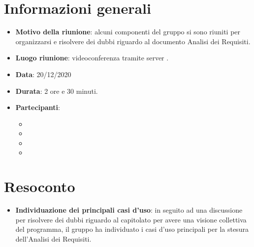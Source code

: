 \section{Informazioni generali}
\begin{itemize}
\item \textbf{Motivo della riunione}: alcuni componenti del gruppo si sono riuniti per organizzarsi e risolvere dei dubbi riguardo al documento Analisi dei Requisiti.
\item \textbf{Luogo riunione}: videoconferenza tramite server .
\item \textbf{Data}: 20/12/2020
\item \textbf{Durata}: 2 ore e 30 minuti.
\item \textbf{Partecipanti}:
	\begin{itemize}
	\item \BM{}
	\item \SG{}
	\item \SP{}
	\item \SH{}
	\end{itemize}
\end{itemize}
\newpage
\section{Resoconto}
\begin{itemize}
\item \textbf{Individuazione dei principali casi d'uso}: in seguito ad una discussione per risolvere dei dubbi riguardo al capitolato per avere una visione collettiva del programma, il gruppo ha individuato i casi d'uso principali per la stesura dell'Analisi dei Requisiti.
\end{itemize}